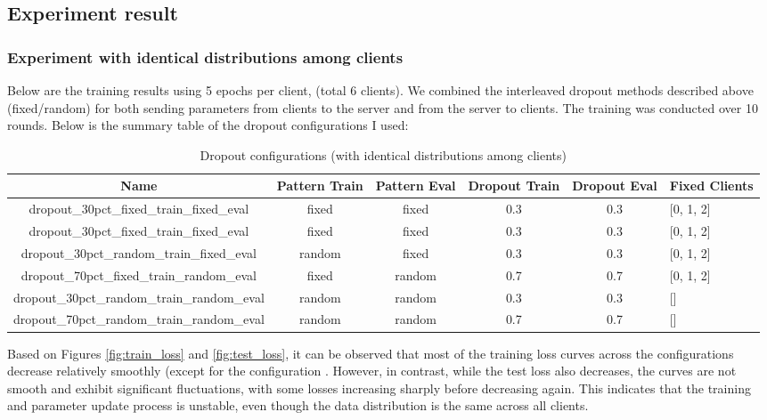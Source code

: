 \documentclass[12pt, a4paper]{article}
\begin{document}
\subsection{Experiment result}
\subsubsection{Experiment with identical distributions among clients}





Below are the training results using 5 epochs per client, (total 6 clients). We combined the interleaved dropout methods described above (fixed/random) for both sending parameters from clients to the server and from the server to clients. The training was conducted over 10 rounds. Below is the summary table of the dropout configurations I used:
    
\begin{table}[htbp]
\centering
\begin{adjustbox}{width=\textwidth}
\begin{tabular}{|c|c|c|c|c|l|}
\hline
\textbf{Name} & \textbf{Pattern Train} & \textbf{Pattern Eval} & \textbf{Dropout Train} & \textbf{Dropout Eval} & \textbf{Fixed Clients} \\
\hline
dropout\_30pct\_fixed\_train\_fixed\_eval & fixed & fixed & 0.3 & 0.3 & [0, 1, 2] \\
\hline
dropout\_30pct\_fixed\_train\_fixed\_eval & fixed & fixed & 0.3 & 0.3 & [0, 1, 2] \\
\hline
dropout\_30pct\_random\_train\_fixed\_eval & random & fixed & 0.3 & 0.3 & [0, 1, 2] \\
\hline
dropout\_70pct\_fixed\_train\_random\_eval & fixed & random & 0.7 & 0.7 & [0, 1, 2] \\
\hline
dropout\_30pct\_random\_train\_random\_eval & random & random & 0.3 & 0.3 & [] \\
\hline
dropout\_70pct\_random\_train\_random\_eval & random & random & 0.7 & 0.7 & [] \\
\hline
\end{tabular}
\end{adjustbox}
\caption{Dropout configurations (with identical distributions among clients) }
\end{table}

Based on Figures \ref{fig:train_loss} and \ref{fig:test_loss}, it can be observed that most of the training loss curves across the configurations decrease relatively smoothly (except for the configuration . However, in contrast, while the test loss also decreases, the curves are not smooth and exhibit significant fluctuations, with some losses increasing sharply before decreasing again. This indicates that the training and parameter update process is unstable, even though the data distribution is the same across all clients. 
\end{document}
